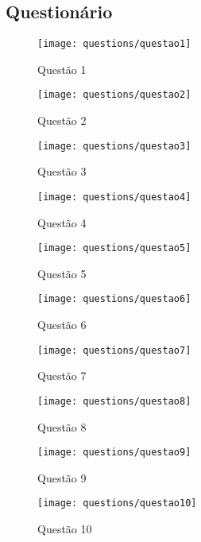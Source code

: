 \begin{apendicesenv} 

\partapendices

\chapter{Questionário} \label{apen:questionario}

\begin{figure}[H]
	\centering
	\texttt{[image: questions/questao1]}
	\caption[Questão 1]{Questão 1}
\end{figure}
\begin{figure}[H]
	\centering
	\texttt{[image: questions/questao2]}
	\caption[Questão 2]{Questão 2}
\end{figure}
\begin{figure}[H]
	\centering
	\texttt{[image: questions/questao3]}
	\caption[Questão 3]{Questão 3}
\end{figure}
\begin{figure}[H]
	\centering
	\texttt{[image: questions/questao4]}
	\caption[Questão 4]{Questão 4}
\end{figure}
\begin{figure}[H]
	\centering
	\texttt{[image: questions/questao5]}
	\caption[Questão 5]{Questão 5}
\end{figure}
\begin{figure}[H]
	\centering
	\texttt{[image: questions/questao6]}
	\caption[Questão 6]{Questão 6}
\end{figure}
\begin{figure}[H]
	\centering
	\texttt{[image: questions/questao7]}
	\caption[Questão 7]{Questão 7}
\end{figure}
\begin{figure}[H]
	\centering
	\texttt{[image: questions/questao8]}
	\caption[Questão 8]{Questão 8}
\end{figure}
\begin{figure}[H]
	\centering
	\texttt{[image: questions/questao9]}
	\caption[Questão 9]{Questão 9}
\end{figure}
\begin{figure}[H]
	\centering
	\texttt{[image: questions/questao10]}
	\caption[Questão 10]{Questão 10}
\end{figure}
\begin{figure}[H]

\end{figure}
\end{apendicesenv}
